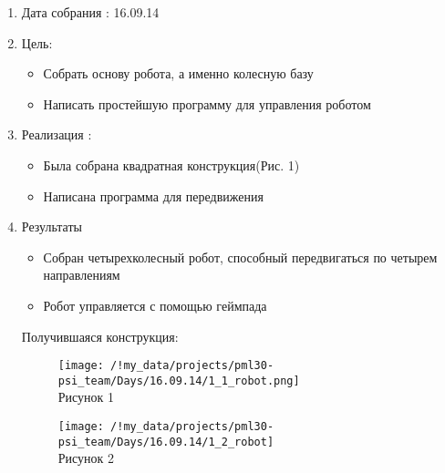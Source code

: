 
	\begin{enumerate}
		\item Дата собрания : 16.09.14
		\item Цель:
		\begin{itemize}
			\item Собрать основу робота, а именно колесную базу
			\item Написать простейшую программу для управления роботом
		\end{itemize}			
		\item Реализация :
		\begin{itemize}
			\item Была собрана квадратная конструкция(Рис. 1)
			\item Написана программа для передвижения
		\end{itemize}
		\item Результаты
		\begin{itemize}
			\item Собран четырехколесный робот, способный передвигаться по четырем направлениям
			\item Робот управляется с помощью геймпада
		\end{itemize}
		Получившаяся конструкция:
		\begin{figure} [h]
			\centering
			\begin{minipage}{0.3\linewidth}
				\texttt{[image: /!my\_data/projects/pml30-psi\_team/Days/16.09.14/1\_1\_robot.png]}\\ Рисунок 1
			\end{minipage}
			\begin{minipage}{0.3\linewidth}
				\texttt{[image: /!my\_data/projects/pml30-psi\_team/Days/16.09.14/1\_2\_robot]}\\ Рисунок 2
			\end{minipage}
		\end{figure}
	\end{enumerate}